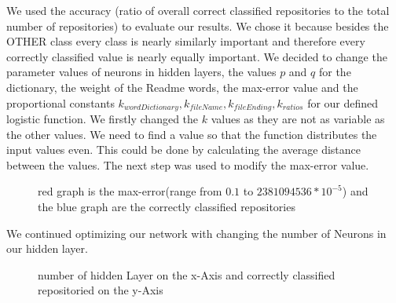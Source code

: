 \documentclass[paper=A4,pagesize=auto,12pt,headinclude=true,footinclude=true,BCOR=0mm,DIV=calc]{scrartcl}
\begin{document}
	We used the accuracy (ratio of overall correct classified repositories to the total number of repositories) to evaluate our results. We chose it because besides the OTHER class every class is nearly similarly important and therefore every correctly classified value is nearly equally important.
	We decided to change the parameter values of neurons in hidden layers, the values $p$ and $q$ for the dictionary, the weight of the Readme words, the max-error value and the proportional constants $k_{wordDictionary}, k_{fileName}, k_{fileEnding}, k_{ratios}$ for our defined logistic function.
	We firstly changed the $k$ values as they are not as variable as the other values. We need to find a value so that the function distributes the input values even. This could be done by calculating the average distance between the values.
	The next step was used to modify the max-error value.
		\begin{figure}[H]
			\caption{red graph is the max-error(range from $0.1$ to $2381094536 * 10^{-5}$) and the blue graph are the correctly classified repositories}
		\end{figure}
		
	We continued optimizing our network with changing the number of Neurons in our hidden layer.
		\begin{figure}[H]
			\caption{number of hidden Layer on the x-Axis and correctly classified repositoried on the y-Axis}
		\end{figure}
	 
\end{document}
